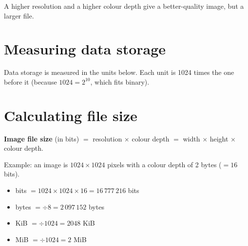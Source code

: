 \documentclass[11pt]{article}
\begin{document}
A higher resolution and a higher colour depth give a better-quality image, but a larger file.

\section*{Measuring data storage}

Data storage is measured in the units below. Each unit is 1024 times the one before it (because $1024 = 2^{10}$, which fits binary).

\begin{center}
\end{center}

\section*{Calculating file size}

\textbf{Image file size} (in bits) $=$ resolution $\times$ colour depth $=$ width $\times$ height $\times$ colour depth.

Example: an image is $1024 \times 1024$ pixels with a colour depth of 2 bytes ($= 16$ bits).

\begin{itemize}
\item bits $= 1024 \times 1024 \times 16 = 16\,777\,216$ bits

\item bytes $= \div 8 = 2\,097\,152$ bytes

\item KiB $= \div 1024 = 2048$ KiB

\item MiB $= \div 1024 = 2$ MiB

\end{itemize}
\end{document}
